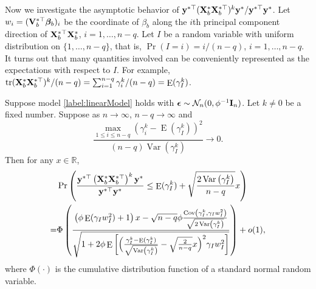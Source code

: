 \documentclass[smallextended]{svjour3}       %
\DeclareMathOperator{\mytr}{tr}
\DeclareMathOperator{\myE}{E}
\DeclareMathOperator{\myVar}{Var}
\DeclareMathOperator{\myCov}{Cov}
\newcommand{\By}{\mathbf{y}}    \newcommand{\Bz}{\mathbf{z}}
\newcommand{\bfsym}[1]{\ensuremath{\boldsymbol{#1}}}
\def\bbeta{\bfsym \beta}
\begin{document}
Now we investigate the asymptotic behavior of
    ${
\By^{*\top}
    (\BX_b^* \BX_b^{*\top})^{k} 
        \By^*
    }/{\By^{*\top} \By^*}$.
Let $w_i=(\BV_b^{*\top} \bbeta_b)_i$ be the coordinate of $\beta_b$ along the $i$th principal component direction of $\mathbf{X}_b^{*\top} \mathbf{X}_b^*$, $i=1,\ldots, n-q$.
Let $I$ be a random variable with uniform distribution on $\{1,\ldots, n-q\}$, that is, $\Pr \left( I=i \right)=i/(n-q)$, $i=1,\ldots, n-q$.
It turns out that many quantities involved can be conveniently represented as the expectations with respect to $I$.
For example, $
        {
            \mytr(\BX_b^* \BX_b^{*\top})^k
        }/
        (n-q )
        =
        \sum_{i=1}^{n-q} \gamma_i^k /(n-q)
        =\myE (\gamma_I^k)
$.

\begin{theorem}\label{generalTheorem}
    Suppose model \eqref{label:linearModel} holds with $\bepsilon\sim \mathcal N_n (0,\phi^{-1} \BI_n)$.
    Let $k\neq 0$ be a fixed number.
    Suppose as $n\to \infty$, $n-q\to \infty$ and
\begin{equation}
    \frac{
        \max_{1\leq i \leq n-q}
        \left( 
        \gamma_i^k
            -
                \myE (\gamma_I^k)
        \right)^2
    }{
        (n-q) \myVar (\gamma_I^k)
    }\to 0.
    \label{eq:toBeCondition}
\end{equation}
Then for any $x\in \mathbb R$,
\begin{equation*}
    \begin{split}
    &\Pr\left( 
        \frac{
            \By^{*\top} \left( \BX_b^* \BX_b^{*\top} \right)^k \By^*
        }{
            \By^{*\top} \By^*
        } 
        \leq 
        \myE (\gamma_I^k)
        +\sqrt{
            \frac{2\myVar\left( \gamma_I^k \right)}{n-q} 
        }
        x
    \right) 
    \\
    =&
    \Phi\left( 
        \frac{
            \left( \phi \myE (\gamma_I w_I^2) + 1 \right)
            x
            -
            \sqrt{n-q}
            \phi
            \frac{
            \myCov\left( \gamma_I^k, \gamma_I w_I^2 \right)
            }{
\sqrt{2 \myVar\left( \gamma_I^k \right)}
            }
        }{
            \sqrt{
                1
                +
                2 \phi
     \myE\left[ 
         \Big( \frac{\gamma_I^k -\myE(\gamma_I^k)}{\sqrt{\myVar\left( \gamma_I^k \right)}} -\sqrt{\frac{2}{n-q}}x \Big)^2
        \gamma_I w_I^2
    \right]
            }
        } 
    \right)
    +o(1)
    ,
    \end{split}
\end{equation*}
where $\Phi(\cdot)$ is the cumulative distribution function of a standard normal random variable.



\end{theorem}
\end{document}
